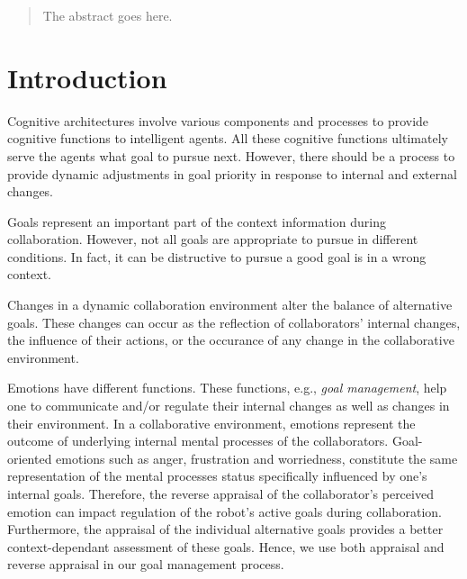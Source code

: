 \documentclass[conference]{IEEEtran}
\begin{document}




\maketitle

\begin{abstract}
The abstract goes here.
\end{abstract}





%
\IEEEpeerreviewmaketitle

\section{Introduction}

Cognitive architectures involve various components and processes to provide
cognitive functions to intelligent agents. All these cognitive functions
ultimately serve the agents what goal to pursue next. However, there
should be a process to provide dynamic adjustments in goal priority in response
to internal and external changes.

Goals represent an important part of the context information during
collaboration. However, not all goals are appropriate to pursue in different
conditions. In fact, it can be distructive to pursue a good goal is in a wrong
context.

Changes in a dynamic collaboration environment alter the balance of alternative
goals. These changes can occur as the reflection of collaborators' internal
changes, the influence of their actions, or the occurance of any change in the
collaborative environment.

Emotions have different functions. These functions, e.g., \textit{goal
management}, help one to communicate and/or regulate their internal changes as
well as changes in their environment. In a collaborative environment, emotions
represent the outcome of underlying internal mental processes of the
collaborators. Goal-oriented emotions such as anger, frustration and
worriedness, constitute the same representation of the mental processes status
specifically influenced by one's internal goals. Therefore, the reverse
appraisal of the collaborator's perceived emotion can impact regulation of the
robot's active goals during collaboration. Furthermore, the appraisal of the
individual alternative goals provides a better context-dependant assessment of
these goals. Hence, we use both appraisal and reverse appraisal in our goal
management process.
\end{document}
